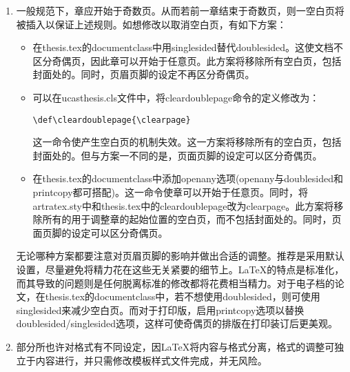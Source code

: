 \begin{enumerate}
                \verb|\advisor{\hspace{+3.0em} xxx~研究员~xxx单位}|
                
                这个解决方案是很不优雅，但问题本质还是样式的设计问题。有时下划线看上去粗细不一致，这是显示的问题，打印正常。
    \item  一般规范下，章应开始于奇数页。从而若前一章结束于奇数页，则一空白页将被插入以保证上述规则。如想修改以取消空白页，有如下方案：
     \begin{itemize}
         \item 在thesis.tex的documentclass中用singlesided替代doublesided。这使文档不区分奇偶页，因此章可以开始于任意页。此方案将移除所有空白页，包括封面处的。同时，页眉页脚的设定不再区分奇偶页。
         \item 可以在ucasthesis.cls文件中，将cleardoublepage命令的定义修改为：

             \verb|\def\cleardoublepage{\clearpage}|

             这一命令使产生空白页的机制失效。这一方案将移除所有的空白页，包括封面处的。但与方案一不同的是，页面页脚的设定可以区分奇偶页。
         \item 在thesis.tex的documentclass中添加openany选项(openany与doublesided和printcopy都可搭配)。这一命令使章可以开始于任意页。同时，将artratex.sty中和thesis.tex中的cleardoublepage改为clearpage。此方案将移除所有的用于调整章的起始位置的空白页，而不包括封面处的。同时，页面页脚的设定可以区分奇偶页。
     \end{itemize}
      无论哪种方案都要注意对页眉页脚的影响并做出合适的调整。推荐是采用默认设置，尽量避免将精力花在这些无关紧要的细节上。\LaTeX{}的特点是标准化，而其导致的问题则是任何脱离标准的修改都将花费相当精力。对于电子档的论文，在thesis.tex的documentclass中，若不想使用doublesided，则可使用singlesided来减少空白页。而对于打印版，启用printcopy选项以替换doublesided/singlesided选项，这样可使奇偶页的排版在打印装订后更美观。

  \item 部分所也许对格式有不同设定，因\LaTeX{}将内容与格式分离，格式的调整可独立于内容进行，并只需修改模板样式文件完成，并无风险。
\end{enumerate}


